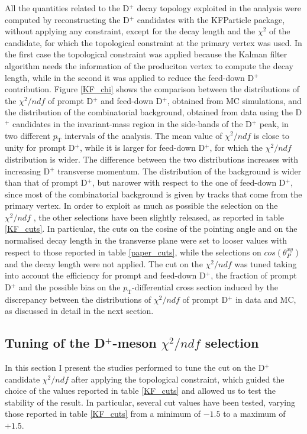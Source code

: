 \documentclass[b5paper,10pt,twoside,oldstyle,classica]{toptesi}
\newcommand{\pt}{p_\text{T}}
\begin{document}
All the quantities related to the D$^+$ decay topology exploited in the analysis were computed by reconstructing the D$^+$ candidates with the KFParticle package, without applying any constraint, except for the decay length and the $\chi^2$ of the candidate, for which the topological constraint at the primary vertex was used. In the first case the topological constraint was applied because the Kalman filter algorithm needs the information of the produciton vertex to compute the decay length, while in the second it was applied to reduce the feed-down D$^+$ contribution. Figure \ref{KF_chi} shows the comparison between the distributions of the $\chi^2/ndf$ of prompt D$^+$ and feed-down D$^+$, obtained from MC simulations, and the distribution of the combinatorial background, obtained from data using the D$^+$ candidates in the invariant-mass region in the side-bands of the D$^+$ peak, in two different $\pt$ intervals of the analysis. The mean value of $\chi^2/ndf$ is close to unity for prompt D$^+$, while it is larger for feed-down D$^+$, for which the $\chi^2/ndf$ distribution is wider. The difference between the two distributions increases with increasing D$^+$ transverse momentum. The distribution of the background is wider than that of prompt D$^+$, but narower with respect to the one of feed-down D$^+$, since most of the combinatorial background is given by tracks that come from the primary vertex. In order to exploit as much as possible the selection on the $\chi^2/ndf$ , the other selections have been slightly released, as reported in table \ref{KF_cuts}. In particular, the cuts on the cosine of the pointing angle and on the normalised decay length in the transverse plane were set to looser values with respect to those reported in table \ref{paper_cuts}, while the selections on $cos(\theta_P^{xy})$ and the decay length were not applied. The cut on the $\chi^2/ndf$ was tuned taking into account the efficiency for prompt and feed-down D$^+$, the fraction of prompt D$^+$ and the possible bias on the $\pt$-differential cross section induced by the discrepancy between the distributions of $\chi^2/ndf$ of prompt D$^+$ in data and MC, as discussed in detail in the next section.  
\subsection{Tuning of the D$^+$-meson $\chi^2/ndf$ selection}
In this section I present the studies performed to tune the cut on the D$^+$ candidate $\chi^2/ndf$ after applying the topological constraint, which guided the choice of the values reported in table \ref{KF_cuts} and allowed us to test the stability of the result. In particular, several cut values have been tested, varying those reported in table \ref{KF_cuts} from a minimum of $-1.5$ to a maximum of $+1.5$. 
\end{document}
